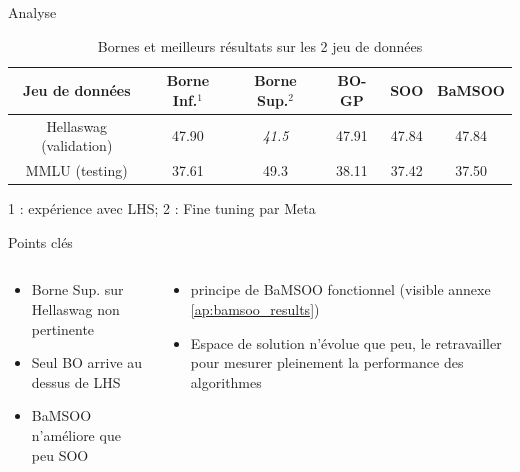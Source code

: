 \begin{frame}{Analyse}
    \begin{table}[h!]
        \centering
        \begin{tabular}{|c||c|c||c|c|c|}
        \hline
           Jeu de données  & Borne Inf.$^1$& Borne Sup.$^2$ & BO-GP & SOO & BaMSOO \\
        \hline
           Hellaswag (validation)  & 47.90 & \textit{41.5} & 47.91 & 47.84 & 47.84\\
           MMLU (testing) & 37.61 & 49.3 & 38.11 & 37.42 & 37.50 \\
        \hline
        \end{tabular}
        \caption{Bornes et meilleurs résultats sur les 2 jeu de données}
    \end{table}
    {\footnotesize 1 : expérience avec LHS; 2 : Fine tuning par Meta}

    \begin{block}{Points clés}     
    \end{block}
    
    \vspace*{-10pt}
    \begin{columns}
        
        \begin{column}{0.45\textwidth} 
                \begin{itemize}
                    \item Borne Sup. sur Hellaswag non pertinente
                    \item Seul BO arrive au dessus de LHS
                    \item BaMSOO n'améliore que peu SOO
                \end{itemize}
        \end{column}  
            \begin{column}{0.45\textwidth}
                \begin{itemize}
                    \item principe de BaMSOO fonctionnel (visible annexe \ref{ap:bamsoo_results})
                    \item Espace de solution n'évolue que peu, le retravailler pour mesurer pleinement la performance des algorithmes
                \end{itemize}
            \end{column}
        
                 
    \end{columns}
    
\end{frame}


